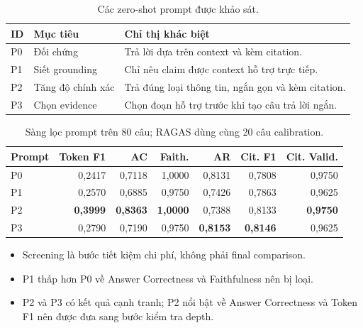 \begin{table}[H]
  \centering
  \caption{Các zero-shot prompt được khảo sát.}
  \label{tab:phase2-prompts}
  \small
  \begin{tabularx}{\textwidth}{@{}p{13mm}p{38mm}X@{}}
    \toprule
    \textbf{ID} & \textbf{Mục tiêu} & \textbf{Chỉ thị khác biệt} \\
    \midrule
    P0 & Đối chứng & Trả lời dựa trên context và kèm citation. \\
    P1 & Siết grounding & Chỉ nêu claim được context hỗ trợ trực tiếp. \\
    P2 & Tăng độ chính xác & Trả đúng loại thông tin, ngắn gọn và kèm citation. \\
    P3 & Chọn evidence & Chọn đoạn hỗ trợ trước khi tạo câu trả lời ngắn. \\
    \bottomrule
  \end{tabularx}
\end{table}

\begin{table}[H]
  \centering
  \caption{Sàng lọc prompt trên 80 câu; RAGAS dùng cùng 20 câu calibration.}
  \label{tab:phase2-prompt-screening}
  \small
  \begin{tabular}{lrrrrrr}
    \toprule
    \textbf{Prompt} & \textbf{Token F1} & \textbf{AC} & \textbf{Faith.} &
    \textbf{AR} & \textbf{Cit. F1} & \textbf{Cit. Valid.} \\
    \midrule
    P0 & 0,2417 & 0,7118 & 1,0000 & 0,8131 & 0,7808 & 0,9750 \\
    P1 & 0,2570 & 0,6885 & 0,9750 & 0,7426 & 0,7863 & 0,9625 \\
    P2 & \textbf{0,3999} & \textbf{0,8363} & \textbf{1,0000} & 0,7388 & 0,8133 & \textbf{0,9750} \\
    P3 & 0,2790 & 0,7190 & 0,9750 & \textbf{0,8153} & \textbf{0,8146} & 0,9625 \\
    \bottomrule
  \end{tabular}
\end{table}

\begin{itemize}
  \item Screening là bước tiết kiệm chi phí, không phải final comparison.
  \item P1 thấp hơn P0 về Answer Correctness và Faithfulness nên bị loại.
  \item P2 và P3 có kết quả cạnh tranh; P2 nổi bật về Answer Correctness và
  Token F1 nên được đưa sang bước kiểm tra depth.
\end{itemize}

